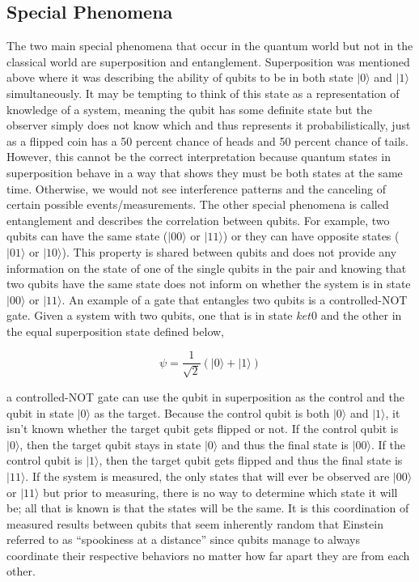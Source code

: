 \documentclass[
	a4paper, %
	10pt, %
	unnumberedsections, %
	twoside, %
]{LTJournalArticle}
\newcommand{\ket}[1]{\lvert#1\rangle} %
\begin{document}
\subsection{Special Phenomena}
The two main special phenomena that occur in the quantum world but not in the classical world are superposition and entanglement. Superposition was mentioned above where it was 
describing the ability of qubits to be in both state $\ket{0}$ and $\ket{1}$ simultaneously. It may be tempting to think of this state as a representation of knowledge of a system, 
meaning the qubit has some definite state but the observer simply does not know which and thus represents it probabilistically, just as a flipped coin has a 50 percent chance of 
heads and 50 percent chance of tails. However, this cannot be the correct interpretation because quantum states in superposition behave in a way that shows they must be both states 
at the same time. Otherwise, we would not see interference patterns and the canceling of certain possible events/measurements. The other special phenomena is called entanglement and 
describes the correlation between qubits. For example, two qubits can have the same state ($\ket{00}$ or $\ket{11}$) or they can have opposite states ($\ket{01}$ or $\ket{10}$). This 
property is shared between qubits and does not provide any information on the state of one of the single qubits in the pair and knowing that two qubits have the same state does not 
inform on whether the system is in state $\ket{00}$ or $\ket{11}$. An example of a gate that entangles two qubits is a controlled-NOT gate. Given a system with two qubits, one that 
is in state $ket{0}$ and the other in the equal superposition state defined below, 

\begin{equation}
	\psi =\frac{1}{\sqrt{2}}(\ket{0} + \ket{1})
	\label{eq:superposition}
\end{equation}

a controlled-NOT gate can use the qubit in superposition as the control and the qubit in state $\ket{0}$ as the target. Because the control qubit is both $\ket{0}$ and $\ket{1}$, it 
isn't known whether the target qubit gets flipped or not. If the control qubit is $\ket{0}$, then the target qubit stays in state $\ket{0}$ and thus the final state is $\ket{00}$. 
If the control qubit is $\ket{1}$, then the target qubit gets flipped and thus the final state is $\ket{11}$. If the system is measured, the only states that will ever be observed 
are $\ket{00}$ or $\ket{11}$ but prior to measuring, there is no way to determine which state it will be; all that is known is that the states will be the same. It is this coordination 
of measured results between qubits that seem inherently random that Einstein referred to as “spookiness at a distance” since qubits manage to always coordinate their respective behaviors 
no matter how far apart they are from each other.
\end{document}
